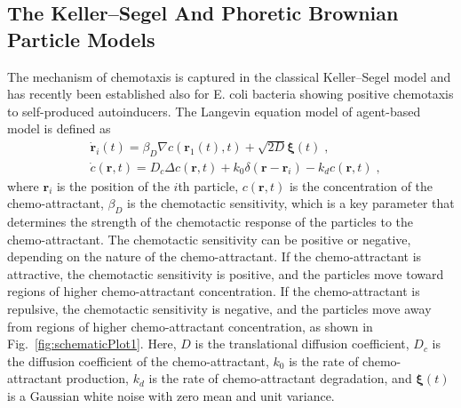 \documentclass[a4paper, amsfonts, amssymb, amsmath, reprint, showkeys, showpacs, nofootinbib, twoside]{revtex4-2}
\begin{document}
\subsection{The Keller--Segel And Phoretic Brownian Particle Models}
The mechanism of chemotaxis is captured in the classical Keller--Segel model and has recently been established also for E. coli bacteria showing positive chemotaxis to self-produced autoinducers. The Langevin equation model of agent-based model is defined as
\begin{subequations}
    \label{eq:agentsChemotaxis}
    \begin{align}
        &\dot{\mathbf{r}}_i(t)=\beta_D\nabla c(\mathbf{r}_1(t),t)+\sqrt{2D}\boldsymbol{\xi }(t)\;,\\
        &\dot{c}(\mathbf{r},t)=D_c\Delta c(\mathbf{r},t)+k_0\delta (\mathbf{r}-\mathbf{r}_i)-k_dc(\mathbf{r},t)\;,
    \end{align}
\end{subequations}
where $\mathbf{r}_i$ is the position of the $i$th particle, $c(\mathbf{r},t)$ is the concentration of the chemo-attractant, $\beta_D$ is the chemotactic sensitivity, which is a key parameter that determines the strength of the chemotactic response of the particles to the chemo-attractant. The chemotactic sensitivity can be positive or negative, depending on the nature of the chemo-attractant. If the chemo-attractant is attractive, the chemotactic sensitivity is positive, and the particles move toward regions of higher chemo-attractant concentration. If the chemo-attractant is repulsive, the chemotactic sensitivity is negative, and the particles move away from regions of higher chemo-attractant concentration, as shown in Fig.~\ref{fig:schematicPlot1}.
Here, $D$ is the translational diffusion coefficient, $D_c$ is the diffusion coefficient of the chemo-attractant, $k_0$ is the rate of chemo-attractant production, $k_d$ is the rate of chemo-attractant degradation, and $\boldsymbol{\xi }(t)$ is a Gaussian white noise with zero mean and unit variance.
\end{document}
